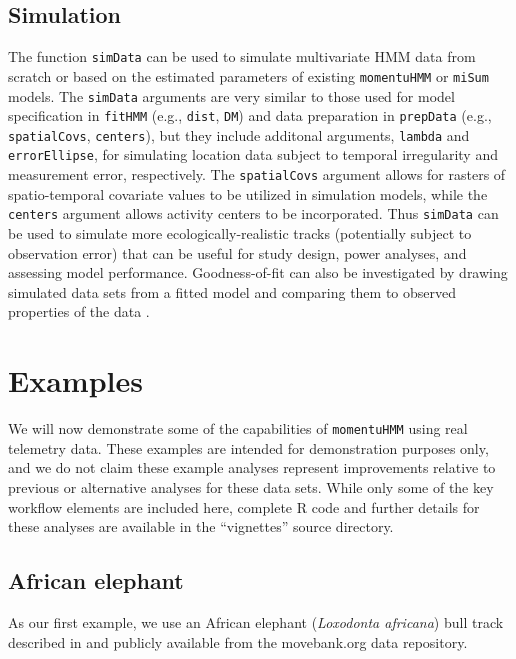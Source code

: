 \documentclass[12pt]{article}\usepackage[]{graphicx}\usepackage[]{color}
\begin{document}
\subsection{Simulation}
The function \verb|simData| can be used to simulate multivariate HMM data from scratch or based on the estimated parameters of existing \verb|momentuHMM| or \verb|miSum| models.  The \verb|simData| arguments are very similar to those used for model specification in \verb|fitHMM| (e.g., \verb|dist|, \verb|DM|) and data preparation in \verb|prepData| (e.g., \verb|spatialCovs|, \verb|centers|), but they include additonal arguments, \verb|lambda| and \verb|errorEllipse|, for simulating location data subject to temporal irregularity and measurement error, respectively. The \verb|spatialCovs| argument allows for rasters of spatio-temporal covariate values to be utilized in simulation models, while the \verb|centers| argument allows activity centers to be incorporated. Thus \verb|simData| can be used to simulate more ecologically-realistic tracks (potentially subject to observation error) that can be useful for study design, power analyses, and assessing model performance. Goodness-of-fit can also be investigated by drawing simulated data sets from a fitted model and comparing them to observed properties of the data \citep{MoralesEtAl2004}.
  
\section{Examples}
\label{sec:example}
We will now demonstrate some of the capabilities of \verb|momentuHMM| using real telemetry data. These examples are intended for demonstration purposes only, and we do not claim these example analyses represent improvements relative to previous or alternative analyses for these data sets. While only some of the key workflow elements are included here, complete R code and further details for these analyses are available in the ``vignettes'' source directory.


\subsection{African elephant}
\label{sec:elephant}
As our first example, we use an African elephant ({\it Loxodonta africana}) bull track described in \cite{WallEtAl2014} and publicly available from the movebank.org data repository. 
\end{document}
